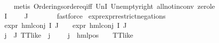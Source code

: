\begin{isabellebody}
\ \ \ \ \isamarkupfalse%
\ {\isacharparenleft}{\kern0pt}metis\ Orderings{\isachardot}{\kern0pt}order{\isacharunderscore}{\kern0pt}eq{\isacharunderscore}{\kern0pt}iff\ UnI{}\ Un{\isacharunderscore}{\kern0pt}empty{\isacharunderscore}{\kern0pt}right\ all{\isacharunderscore}{\kern0pt}not{\isacharunderscore}{\kern0pt}in{\isacharunderscore}{\kern0pt}conv\ zero{\isacharunderscore}{\kern0pt}le{\isacharparenright}{\kern0pt}\isanewline
\ \ \isamarkupfalse%
\ \isamarkupfalse%
\ {\isachardoublequoteopen}{\isasymPhi}\ {\isacharbackquote}{\kern0pt}\ I\ {\isacharequal}{\kern0pt}\ {\isacharbraceleft}{\kern0pt}{\isacharbraceright}{\kern0pt}{\isachardoublequoteclose}\ {\isachardoublequoteopen}{\isasymPhi}\ {\isacharbackquote}{\kern0pt}\ J\ {\isacharequal}{\kern0pt}\ {\isacharbraceleft}{\kern0pt}{\isacharbraceright}{\kern0pt}{\isachardoublequoteclose}\isanewline
\ \ \ \ \isamarkupfalse%
\ fastforce{\isacharplus}{\kern0pt}\isanewline
{}\isamarkupfalse%
%
\endisatagproof
{\isafoldproof}%
%
\isadelimproof
\isanewline
%
\endisadelimproof
\isanewline
{}\isamarkupfalse%
\ expr{\isacharunderscore}{\kern0pt}{}{\isacharunderscore}{\kern0pt}expr{\isacharunderscore}{\kern0pt}{}{\isacharunderscore}{\kern0pt}restrict{\isacharunderscore}{\kern0pt}negations{\isacharcolon}{\kern0pt}\ \isanewline
\ \ \ {\isachardoublequoteopen}expr{\isacharunderscore}{\kern0pt}{}\ {\isacharparenleft}{\kern0pt}hml{\isacharunderscore}{\kern0pt}conj\ I\ J\ {\isasymPhi}{\isacharparenright}{\kern0pt}\ {\isasymle}\ {}{\isachardoublequoteclose}\ {\isachardoublequoteopen}expr{\isacharunderscore}{\kern0pt}{}\ {\isacharparenleft}{\kern0pt}hml{\isacharunderscore}{\kern0pt}conj\ I\ J\ {\isasymPhi}{\isacharparenright}{\kern0pt}\ {\isasymle}\ {}{\isachardoublequoteclose}\isanewline
\ \ \ {\isachardoublequoteopen}{\isacharparenleft}{\kern0pt}{\isasymforall}j\ {\isasymin}\ J{\isachardot}{\kern0pt}\ {\isacharparenleft}{\kern0pt}TT{\isacharunderscore}{\kern0pt}like\ {\isacharparenleft}{\kern0pt}{\isasymPhi}\ j{\isacharparenright}{\kern0pt}{\isacharparenright}{\kern0pt}\ {\isasymor}\ {\isacharparenleft}{\kern0pt}{\isasymexists}{\isasymalpha}\ {\isasymchi}{\isachardot}{\kern0pt}\ {\isacharparenleft}{\kern0pt}{\isacharparenleft}{\kern0pt}{\isasymPhi}\ j{\isacharparenright}{\kern0pt}\ {\isacharequal}{\kern0pt}\ hml{\isacharunderscore}{\kern0pt}pos\ {\isasymalpha}\ {\isasymchi}\ {\isasymand}\ {\isacharparenleft}{\kern0pt}TT{\isacharunderscore}{\kern0pt}like\ {\isasymchi}{\isacharparenright}{\kern0pt}{\isacharparenright}{\kern0pt}{\isacharparenright}{\kern0pt}{\isacharparenright}{\kern0pt}{\isachardoublequoteclose}\isanewline

\end{isabellebody}

